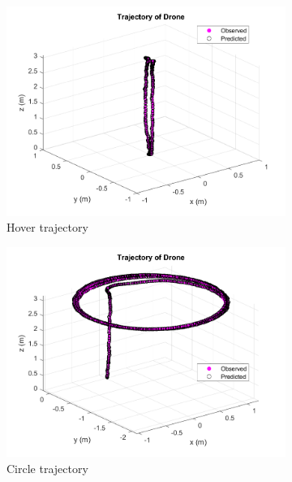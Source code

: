 \documentclass[letterpaper, paper,11pt]{AAS}	%
\begin{document}
\begin{figure}[H]
\centering
\begin{subfigure}{.5\textwidth}
	\centering
	\includegraphics[width=\textwidth]{../hover1_traj}
	\caption{Hover trajectory}
	\label{fig:hover1_traj}
\end{subfigure}%
\begin{subfigure}{.5\textwidth}
	\centering
	\includegraphics[width=\textwidth]{../circle1_traj}
	\caption{Circle trajectory}
	\label{fig:circle1_traj}
\end{subfigure}
\begin{subfigure}{.5\textwidth}
	\centering

\end{subfigure}
\end{figure}
\end{document}
